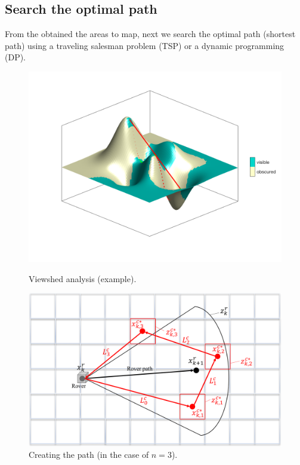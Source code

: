 \documentclass[conference]{IEEEtran}
\begin{document}

\subsection{Search the optimal path}
From the obtained the areas to map, next we search the optimal path (shortest path) using a traveling salesman problem (TSP) or a dynamic programming (DP).  

\begin{figure}[h]
		\centering
		\includegraphics[width=1.0\columnwidth]{figs/vs.png}
		\caption{Viewshed analysis (example).}
		\label{fig:vs}
		\centering
		\includegraphics[width=1.0\columnwidth]{figs/8_4.png}
		\caption{Creating the path (in the case of $n=3$).}
		\label{fig:8_4}
\end{figure}
\end{document}
